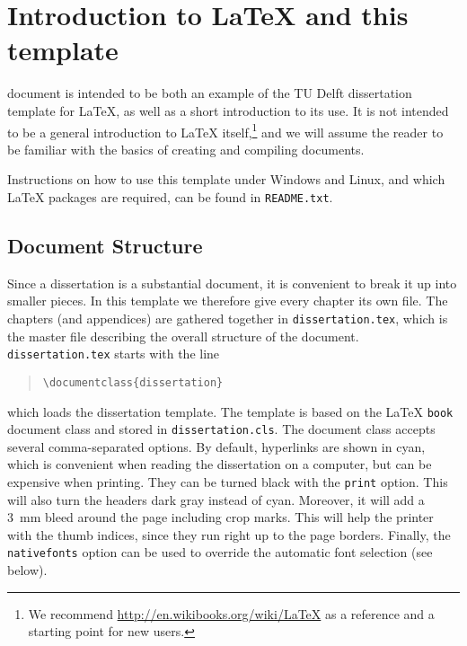 \chapter{Introduction to \LaTeX{} and this template}
\label{chp:intro_to_latex}

\graphicspath{{chapter_4/figures/}} %

 document is intended to be both an example of the TU Delft dissertation template for \LaTeX, as well as a short introduction to its use. It is not intended to be a general introduction to \LaTeX{} itself,\footnote{We recommend \url{http://en.wikibooks.org/wiki/LaTeX} as a reference and a starting point for new users.} and we will assume the reader to be familiar with the basics of creating and compiling documents.

Instructions on how to use this template under Windows and Linux, and which \LaTeX{} packages are required, can be found in \texttt{README.txt}.

\section{Document Structure}

Since a dissertation is a substantial document, it is convenient to break it up into smaller pieces. In this template we therefore give every chapter its own file. The chapters (and appendices) are gathered together in \texttt{dissertation.tex}, which is the master file describing the overall structure of the document. \texttt{dissertation.tex} starts with the line

\begin{quote}
	\texttt{\textbackslash documentclass\{dissertation\}}
\end{quote}
which loads the dissertation template. The template is based on the \LaTeX{} \texttt{book} document class and stored in \texttt{dissertation.cls}. The document class accepts several comma-separated options. By default, hyperlinks are shown in cyan, which is convenient when reading the dissertation on a computer, but can be expensive when printing. They can be turned black with the \texttt{print} option. This will also turn the headers dark gray instead of cyan. Moreover, it will add a 3~mm bleed around the page including crop marks. This will help the printer with the thumb indices, since they run right up to the page borders. Finally, the \texttt{nativefonts} option can be used to override the automatic font selection (see below).

